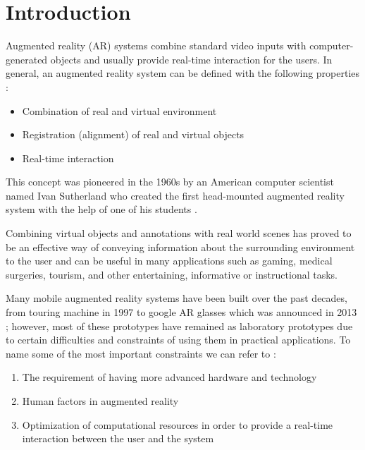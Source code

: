 \documentclass[dvips,letterpaper,12pt]{report}
\begin{document}
\chapter{Introduction}

Augmented reality (AR) systems combine standard video inputs with computer-generated objects and
usually provide real-time interaction for the users. 
In general, an augmented reality system can be defined with the following properties \cite{azuma01} :
\begin{itemize}
\item Combination of real and virtual environment
\item Registration (alignment) of real and virtual objects
\item Real-time interaction
\end{itemize}
This concept was pioneered in the 1960s by an American computer scientist named Ivan Sutherland
who created the first head-mounted augmented reality
system with the help of one of his students \cite{azuma01}.

Combining virtual objects and annotations with real
world scenes has proved to be an effective way of conveying information about the surrounding environment to
the user and can be useful in many applications such as gaming, medical surgeries, tourism, and other entertaining, informative or instructional tasks.

Many mobile augmented reality systems have been built over the past decades, from touring machine in 1997 \cite{fei97} 
to google AR glasses which was announced in 2013 \cite{google}; however, most of these prototypes have remained as laboratory prototypes
due to certain difficulties and constraints of using them in practical applications. To name some of the most important constraints
we can refer to \cite{liv05}:
\begin{enumerate}
\item The requirement of having more advanced hardware and technology
\item Human factors in augmented reality 
\item Optimization of computational resources in order to provide a real-time interaction between the user and the system
\end{enumerate}
\end{document}
